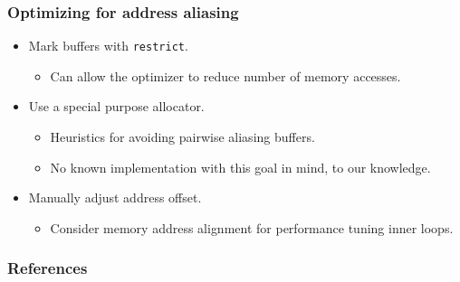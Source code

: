 \documentclass{beamer}
\begin{document}
\begin{frame}
\frametitle{Optimizing for address aliasing}


\begin{itemize}
  \item Mark buffers with \texttt{restrict}.
  \begin{itemize}
    \item Can allow the optimizer to reduce number of memory accesses.
  \end{itemize}
  \item Use a special purpose allocator.
  \begin{itemize}
    \item Heuristics for avoiding pairwise aliasing buffers.
    \item No known implementation with this goal in mind, to our knowledge.
  \end{itemize}
  \item Manually adjust address offset.
  \begin{itemize}
    \item Consider memory address alignment for performance tuning inner loops.
  \end{itemize}
\end{itemize}

\end{frame}


\begin{frame}

\frametitle{References}

\scriptsize{}


\end{frame}
\end{document}

